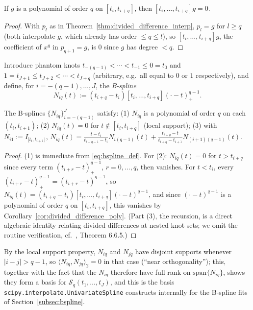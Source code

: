 \begin{corollary}
\label{cor:divided_difference_poly}
If $g$ is a polynomial of order $q$ on $[t_i,t_{i+q}]$, then
$[t_i,\dots,t_{i+q}]g=0$.
\end{corollary}

\begin{proof}
With $p_l$ as in Theorem~\ref{thm:divided_difference_interp}, $p_l=g$ for
$l\geq q$ (both interpolate $g$, which already has order $\leq q\leq l$),
so $[t_i,\dots,t_{i+q}]g$, the coefficient of $x^q$ in $p_{q+1}=g$, is $0$
since $g$ has degree $<q$.
\end{proof}

Introduce phantom knots $t_{-(q-1)}<\cdots<t_{-1}\leq 0=t_0$ and
$1=t_{J+1}\leq t_{J+2}<\cdots<t_{J+q}$ (arbitrary, e.g.\ all equal to $0$
or $1$ respectively), and define, for $i=-(q-1),\dots,J$, the \emph{B-spline}
\begin{equation}
N_{iq}(t) := (t_{i+q}-t_i)[t_i,\dots,t_{i+q}](\cdot-t)_+^{q-1}.
\label{eq:bspline_def}
\end{equation}

\begin{theorem}
\label{thm:bspline_properties}
The B-splines $\{N_{iq}\}_{i=-(q-1)}^J$ satisfy: (1) $N_{iq}$ is a
polynomial of order $q$ on each $(t_i,t_{i+1})$; (2) $N_{iq}(t)=0$ for
$t\notin[t_i,t_{i+q}]$ (local support); (3) with $N_{i1}:=I_{[t_i,t_{i+1})}
$, $N_{iq}(t) = \frac{t-t_i}{t_{i+q-1}-t_i}N_{i(q-1)}(t) +
\frac{t_{i+q}-t}{t_{i+q}-t_{i+1}}N_{(i+1)(q-1)}(t)$.
\end{theorem}

\begin{proof}
(1) is immediate from \eqref{eq:bspline_def}. For (2): $N_{iq}(t)=0$ for
$t>t_{i+q}$ since every term $(t_{i+r}-t)_+^{q-1}$, $r=0,\dots,q$, then
vanishes. For $t<t_i$, every $(t_{i+r}-t)_+^{q-1}=(t_{i+r}-t)^{q-1}$, so
$N_{iq}(t) = (t_{i+q}-t_i)[t_i,\dots,t_{i+q}](\cdot-t)^{q-1}$, and since
$(\cdot-t)^{q-1}$ is a polynomial of order $q$ on $[t_i,t_{i+q}]$, this
vanishes by Corollary~\ref{cor:divided_difference_poly}. (Part (3), the
recursion, is a direct algebraic identity relating divided differences at
nested knot sets; we omit the routine verification, cf.\
\cite{hsingeubank2015}, Theorem 6.6.5.)
\end{proof}

By the local support property, $N_{iq}$ and $N_{jq}$ have disjoint supports
whenever $|i-j|>q-1$, so $\langle N_{iq},N_{jq}\rangle_2=0$ in that case
(``near orthogonality''); this, together with the fact that the $N_{iq}$
therefore have full rank on $\mathrm{span}\{N_{iq}\}$, shows they form a
basis for $\mathcal{S}_q(t_1,\dots,t_J)$, and this is the basis
\texttt{scipy.interpolate.UnivariateSpline} constructs internally for the
B-spline fits of Section~\ref{subsec:bspline}.

